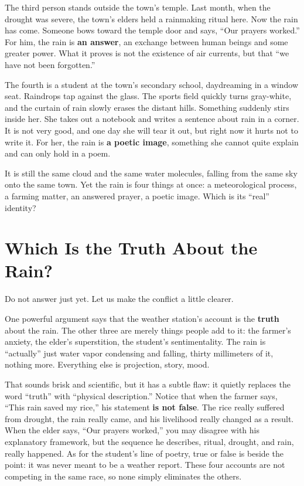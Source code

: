 The third person stands outside the town's temple. Last month, when the drought was severe, the town's elders held a rainmaking ritual here. Now the rain has come. Someone bows toward the temple door and says, ``Our prayers worked.'' For him, the rain is \textbf{an answer}, an exchange between human beings and some greater power. What it proves is not the existence of air currents, but that ``we have not been forgotten.''

The fourth is a student at the town's secondary school, daydreaming in a window seat. Raindrops tap against the glass. The sports field quickly turns gray-white, and the curtain of rain slowly erases the distant hills. Something suddenly stirs inside her. She takes out a notebook and writes a sentence about rain in a corner. It is not very good, and one day she will tear it out, but right now it hurts not to write it. For her, the rain is \textbf{a poetic image}, something she cannot quite explain and can only hold in a poem.

It is still the same cloud and the same water molecules, falling from the same sky onto the same town. Yet the rain is four things at once: a meteorological process, a farming matter, an answered prayer, a poetic image. Which is its ``real'' identity?

\section{Which Is the Truth About the Rain?}
Do not answer just yet. Let us make the conflict a little clearer.

One powerful argument says that the weather station's account is the \textbf{truth} about the rain. The other three are merely things people add to it: the farmer's anxiety, the elder's superstition, the student's sentimentality. The rain is ``actually'' just water vapor condensing and falling, thirty millimeters of it, nothing more. Everything else is projection, story, mood.

That sounds brisk and scientific, but it has a subtle flaw: it quietly replaces the word ``truth'' with ``physical description.'' Notice that when the farmer says, ``This rain saved my rice,'' his statement \textbf{is not false}. The rice really suffered from drought, the rain really came, and his livelihood really changed as a result. When the elder says, ``Our prayers worked,'' you may disagree with his explanatory framework, but the sequence he describes, ritual, drought, and rain, really happened. As for the student's line of poetry, true or false is beside the point: it was never meant to be a weather report. These four accounts are not competing in the same race, so none simply eliminates the others.

